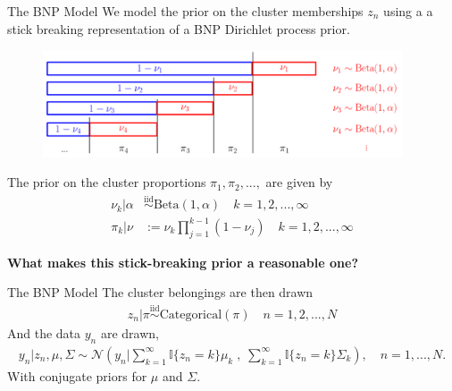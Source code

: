 \documentclass[10pt]{beamer}\usepackage[]{graphicx}\usepackage[]{color}
\begin{document}
\begin{frame}{The BNP Model}
We model the prior on the cluster memberships $z_n$ using a
a stick breaking representation of a BNP Dirichlet process prior.
\vspace{-0.1in}
\begin{figure}[!h]
\centering
\includegraphics[width = 0.95\textwidth]{./figures/DP_stick_breaking.png}
\end{figure}
\vspace{-0.1in}
The prior on the cluster proportions $\pi_1, \pi_2, ..., $ are given by
%
\begin{align*}
\nu_k \vert \alpha &\overset{\text{iid}}{\sim} \text{Beta}\left(1, \alpha \right)\quad k = 1, 2, ..., \infty \\
\pi_k | \nu &:= \nu_k \prod_{j=1}^{k-1} (1 - \nu_j) \quad k = 1, 2, ..., \infty
\end{align*}
%
\vspace{-0.1in}\pause 
%
\begin{mdframed}[style=MyFrame]
\begin{center}
{\bf What makes this stick-breaking prior a reasonable one?}
\end{center}
\end{mdframed}

\end{frame}

\begin{frame}{The BNP Model}
The cluster belongings are then drawn
\begin{align*}
  z_n \vert \pi \overset{\text{iid}}{\sim} \mathrm{Categorical}(\pi)
  \quad n = 1, 2, ..., N
\end{align*}
%
And the data $y_n$ are drawn,
\begin{align*}
	y_n | z_n, \mu, \Sigma \sim
        \mathcal{N}\left(
            y_n \Big\vert
                \sum_{k=1}^\infty \mathbb{I}\{z_n = k\} \mu_k \;,
              \; \sum_{k=1}^\infty \mathbb{I}\{z_n = k\} \Sigma_k\right),
	\quad n = 1, ..., N.
\end{align*}
%
With conjugate priors for $\mu$ and $\Sigma$.

\end{frame}
\end{document}
